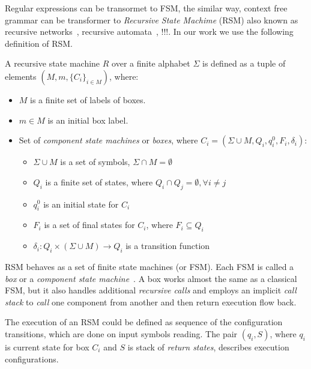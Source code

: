 Regular expressions can be transormet to FSM, the similar way, context free grammar can be transformer to \textit{Recursive State Machime} (RSM) also known as recursive networks~\cite{!!!}, recursive automata~\cite{!!!}, !!!. 
In our work we use the following definition of RSM.
\begin{definition}
A recursive state machine $R$ over a finite alphabet $\Sigma$ is defined as a tuple of elements $(M,m,\{C_i\}_{i \in M})$, where:

\begin{itemize}
    \item $M$ is a finite set of labels of boxes.
    \item $m \in M$ is an initial box label.
    \item Set of \textit{component state machines} or \textit{boxes},
          where $C_i=(\Sigma \cup M, Q_i,q_i^0,F_i,\delta_i)$:
    \begin{itemize}
        \item $\Sigma \cup M$ is a set of symbols, $\Sigma \cap M = \emptyset$
        \item $Q_i$ is a finite set of states,
              where $Q_i \cap Q_j = \emptyset, \forall i \neq j$
        \item $q_i^0$ is an initial state for $C_i$
        \item $F_i$ is a set of final states for $C_i$, where $F_i \subseteq Q_i$
        \item $\delta_i: Q_i \times (\Sigma \cup M) \to Q_i$ is a transition function %
    \end{itemize}
\end{itemize}

\end{definition}

RSM behaves as a set of finite state machines (or FSM).
Each FSM is called a \textit{box} or a \textit{component state machine}~\cite{rsm:analysis:10.1007/3-540-44585-4_18}.
A box works almost the same as a classical FSM, but it also handles additional \textit{recursive calls} and employs an implicit \textit{call stack} to \textit{call} one component from another and then return execution flow back.

The execution of an RSM could be defined as sequence of the configuration transitions, which are done on input symbols reading. 
The pair $(q_i,S)$, where $q_i$ is current state for box $C_i$ and $S$ is stack of \textit{return states}, describes execution configurations. 

